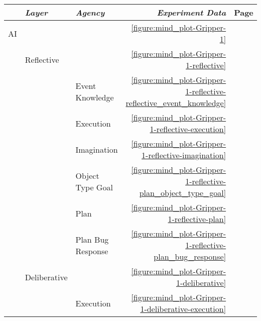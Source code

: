 \begin{table}
  \centering
  \begin{tabular}{lllrr}
    ~         & \emph{Layer}      & \emph{Agency}      & \emph{Experiment Data}                                                      & Page \\
    \hline AI &                   &                    & \autoref{figure:mind_plot-Gripper-1}                                        & \pageref{figure:mind_plot-Gripper-1} \\
    ~         & Reflective        &                    & \autoref{figure:mind_plot-Gripper-1-reflective}                             & \pageref{figure:mind_plot-Gripper-1-reflective} \\
    ~         &                   & Event Knowledge    & \autoref{figure:mind_plot-Gripper-1-reflective-reflective_event_knowledge}  & \pageref{figure:mind_plot-Gripper-1-reflective-reflective_event_knowledge} \\
    ~         &                   & Execution          & \autoref{figure:mind_plot-Gripper-1-reflective-execution}                   & \pageref{figure:mind_plot-Gripper-1-reflective-execution} \\
    ~         &                   & Imagination        & \autoref{figure:mind_plot-Gripper-1-reflective-imagination}                 & \pageref{figure:mind_plot-Gripper-1-reflective-imagination} \\
    ~         &                   & Object Type Goal   & \autoref{figure:mind_plot-Gripper-1-reflective-plan_object_type_goal}       & \pageref{figure:mind_plot-Gripper-1-reflective-plan_object_type_goal} \\
    ~         &                   & Plan               & \autoref{figure:mind_plot-Gripper-1-reflective-plan}                        & \pageref{figure:mind_plot-Gripper-1-reflective-plan} \\
    ~         &                   & Plan Bug Response  & \autoref{figure:mind_plot-Gripper-1-reflective-plan_bug_response}           & \pageref{figure:mind_plot-Gripper-1-reflective-plan_bug_response} \\
    ~         & Deliberative      &                    & \autoref{figure:mind_plot-Gripper-1-deliberative}                           & \pageref{figure:mind_plot-Gripper-1-deliberative} \\
    ~         &                   & Execution          & \autoref{figure:mind_plot-Gripper-1-deliberative-execution}                 & \pageref{figure:mind_plot-Gripper-1-deliberative-execution} \\

\end{tabular}
\end{table}
